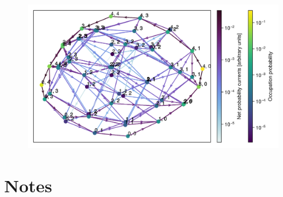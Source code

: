 \documentclass[11pt]{article}
\begin{document}
\begin{abstract}




\end{abstract}

\vspace{1em}

\printbibliography

\vspace{1em}

\begin{figure}[H]
    \centering
    \includegraphics[width=\textwidth]{../../plots/aaa_B=1_C=2_N=4_version=2.5.png}
\end{figure}

\newpage
\section{Notes}
\end{document}
